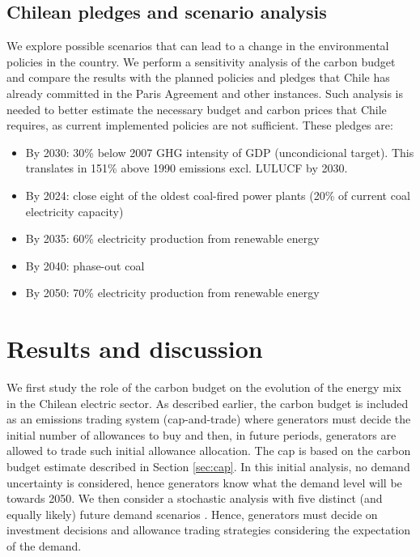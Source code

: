 \documentclass[11pt, letterpaper]{article}
\begin{document}
\subsection{Chilean pledges and scenario analysis}
\label{sec:basecase}
We explore possible scenarios that can lead to a change in the environmental policies in the country. We perform a sensitivity analysis of the carbon budget and compare the results with the planned policies and pledges that Chile has already committed in the Paris Agreement and other instances. Such analysis is needed to better estimate the necessary budget and carbon prices that Chile requires, as current implemented policies are not sufficient. These pledges are:

\begin{itemize}
    \item By 2030: 30\% below 2007 GHG intensity of GDP (uncondicional target). This translates in 151\% above 1990 emissions excl. LULUCF by 2030. 
    \item By 2024: close eight of the oldest coal-fired power plants (20\% of current coal electricity capacity) 
    \item By 2035: 60\% electricity production from renewable energy 
    \item By 2040: phase-out coal 
    \item By 2050: 70\% electricity production from renewable energy
\end{itemize}

\bigskip


\section{Results and discussion}\label{results}
We first study the role of the carbon budget on the evolution of the energy mix in the Chilean electric sector. As described earlier, the carbon budget is included as an emissions trading system (cap-and-trade) where generators must decide the initial number of allowances to buy and then, in future periods, generators are allowed to trade such initial allowance allocation. The cap is based on the carbon budget estimate described in Section \ref{sec:cap}. In this initial analysis, no demand uncertainty is considered, hence generators know what the demand level will be towards 2050. We then consider a stochastic analysis with five distinct (and equally likely) future demand scenarios \cite{HojadeRuta}. Hence, generators must decide on investment decisions and allowance trading strategies considering the expectation of the demand. 
\end{document}
